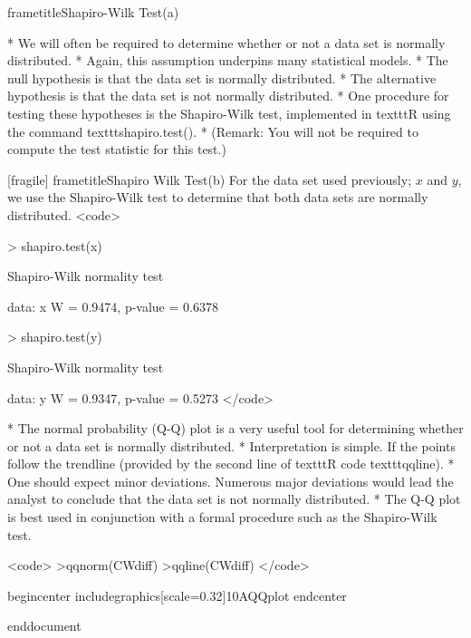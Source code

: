 
frametitle{Shapiro-Wilk Test(a)}



*  We will often be required to determine whether or not a data set is normally distributed.
*  Again, this assumption underpins many statistical models.
*  The null hypothesis is that the data set is normally distributed.
*  The alternative hypothesis is that the data set is not normally distributed.
*  One procedure for testing these hypotheses is the Shapiro-Wilk test, implemented in texttt{R} using the command texttt{shapiro.test()}.
*  (Remark: You will not be required to compute the test statistic for this test.)


[fragile]
frametitle{Shapiro Wilk Test(b)}
For the data set used previously; $x$ and $y$, we use the Shapiro-Wilk test to determine that both data sets are normally distributed.
<code>

> shapiro.test(x)

        Shapiro-Wilk normality test

data:  x
W = 0.9474, p-value = 0.6378

> shapiro.test(y)

        Shapiro-Wilk normality test

data:  y
W = 0.9347, p-value = 0.5273
</code>






*  The normal probability (Q-Q) plot is a very useful tool for determining whether or not a data set is normally distributed.
*  Interpretation is simple. If the points follow the trendline (provided by the second line of texttt{R} code texttt{qqline}).
*  One should expect minor deviations. Numerous major deviations would lead the analyst to conclude that the data set is not normally distributed.
*  The Q-Q plot is best used in conjunction with a formal procedure such as the Shapiro-Wilk test.


<code>
>qqnorm(CWdiff)
>qqline(CWdiff)
</code>




begin{center}
includegraphics[scale=0.32]{10AQQplot}
end{center}


end{document}

